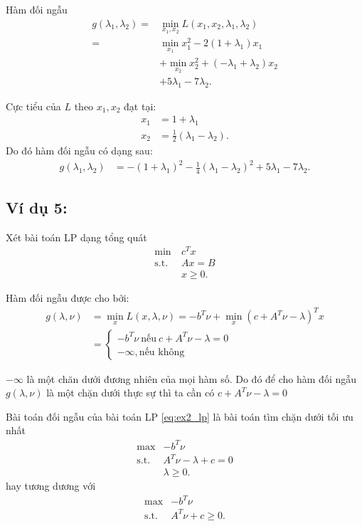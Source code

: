 \documentclass{book}
\begin{document}
Hàm đối ngẫu
\begin{align*}
g(\lambda_1, \lambda_2) = & \min_{x_1, x_2} L(x_1, x_2, \lambda_1, \lambda_2) \\
							= & \min_{x_1} x_1^2 - 2(1 + \lambda_1) x_1 \\
								& + \min_{x_2} x_2^2 + (- \lambda_1 + \lambda_2) x_2\\
								& + 5\lambda_1 - 7 \lambda_2. 
\end{align*}

Cực tiểu của $L$ theo $x_1, x_2$ đạt tại:
\begin{align*}
x_1 &= 1 + \lambda_1\\
x_2 &= \frac{1}{2} (\lambda_1 - \lambda_2).
\end{align*}
Do đó hàm đối ngẫu có dạng sau:
\begin{align*}
g(\lambda_1, \lambda_2) &= - (1 + \lambda_1)^2 - \frac{1}{4} (\lambda_1 - \lambda_2)^2 + 5\lambda_1 - 7 \lambda_2.
\end{align*}

\subsection*{Ví dụ 5:}
Xét bài toán LP dạng tổng quát
\begin{align}
\mathrm{min~} & c^T x \label{eq:ex2_lp}\\
\mathrm{s.t.~} & Ax = B \\
			& x \geq 0.
\end{align}

Hàm đối ngẫu được cho bởi: 
\begin{align*}
g(\lambda, \nu) &= \min_x L(x, \lambda, \nu) = -b^T \nu + \min_x(c + A^T \nu - \lambda)^T x \\
		& = \begin{cases} -b^T \nu ~ \textrm{nếu} ~ c + A^T \nu - \lambda = 0 \\ -\infty , \textrm{nếu không} \end{cases}
\end{align*}

$-\infty$ là một chăn dưới đương nhiên của mọi hàm số. Do đó để cho hàm đối ngẫu $g(\lambda, \nu)$ là một chặn dưới thực sự thì ta cần có $c + A^T \nu - \lambda = 0$

Bài toán đối ngẫu của bài toán LP \eqref{eq:ex2_lp} là bài toán tìm chặn dưới tối ưu nhất
\begin{align*}
\max & - b^T \nu \\
\mathrm{s.t.~} & A^T \nu - \lambda + c = 0 \\
			& \lambda \geq 0.
\end{align*}
hay tương dương với
\begin{align*}
\max & - b^T \nu \\
\mathrm{s.t.~} & A^T \nu  + c \geq 0.
\end{align*}
\end{document}
